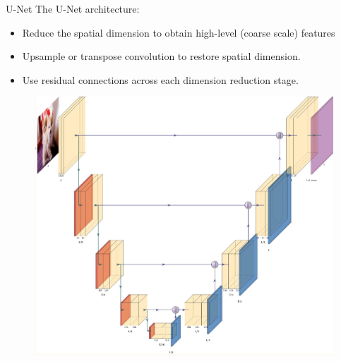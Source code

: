 \begin{frame}[allowframebreaks]

\begin{mydefinitionblock}{8.25}{U-Net}
    The U-Net architecture:

    \begin{itemize}
        \item Reduce the spatial dimension to obtain high-level (coarse scale) features
        \item Upsample or transpose convolution to restore spatial dimension.
        \item Use residual connections across each dimension reduction stage.
    \end{itemize}

    \begin{figure}[H]
        \centering
        \includegraphics[width=1.0\textwidth]{.././assets/8.25.jpg}
    \end{figure}
\end{mydefinitionblock}

\end{frame}

